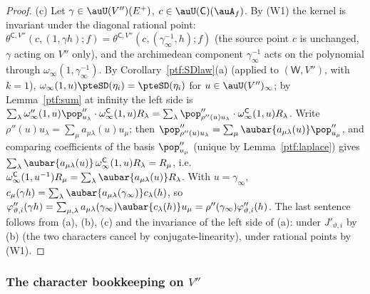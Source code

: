 \documentclass[10pt]{amsart}
\theoremstyle{definition}
\theoremstyle{remark}
\begin{document}
\begin{proof}
(c) Let $\gamma\in\auU(V'')(E^+)$, $c\in\auU(\mathsf C)(\auA_f)$. By (W1) the kernel is invariant under the diagonal
rational point: $\theta^{\mathsf C,V''}(c,(1,\gamma h);f)=\theta^{\mathsf C,V''}(c,(\gamma_\infty^{-1},h);f)$ (the source point $c$ is
unchanged, $\gamma$ acting on $V''$ only), and the archimedean component $\gamma_\infty^{-1}$ acts on the polynomial
through $\omega_\infty(1,\gamma_\infty^{-1})$. By Corollary~\ref{ptf:SDlaw}(a) (applied to $(\mathsf W,V'')$, with $k=1$),
$\omega_\infty(1,u)\pteSD(\eta_i)=\pteSD(\eta_i)$ for $u\in\auU(V'')_\infty$; by Lemma~\ref{ptf:sum} at infinity the left
side is $\sum_\lambda\omega''_\infty(1,u)\pop''_{u_\lambda}\cdot\omega^{\mathsf C}_\infty(1,u)R_\lambda=\sum_\lambda\pop''_{\rho''(u)u_\lambda}\cdot
\omega^{\mathsf C}_\infty(1,u)R_\lambda$. Write $\rho''(u)u_\lambda=\sum_\mu a_{\mu\lambda}(u)u_\mu$; then $\pop''_{\rho''(u)u_\lambda}=
\sum_\mu\aubar{a_{\mu\lambda}(u)}\pop''_{u_\mu}$, and comparing coefficients of the basis $\pop''_{u_\mu}$ (unique by
Lemma~\ref{ptf:laplace}) gives $\sum_\lambda\aubar{a_{\mu\lambda}(u)}\,\omega^{\mathsf C}_\infty(1,u)R_\lambda=R_\mu$, i.e.\
$\omega^{\mathsf C}_\infty(1,u^{-1})R_\mu=\sum_\lambda\aubar{a_{\mu\lambda}(u)}R_\lambda$. With $u=\gamma_\infty$, $c_\mu(\gamma h)=\sum_\lambda\aubar{a_{\mu\lambda}
(\gamma_\infty)}c_\lambda(h)$, so $\varphi''_{\vartheta,i}(\gamma h)=\sum_{\mu,\lambda}a_{\mu\lambda}(\gamma_\infty)\aubar{c_\lambda(h)}u_\mu=\rho''(\gamma_\infty)
\varphi''_{\vartheta,i}(h)$. The last sentence follows from (a), (b), (c) and the invariance of the left side of (a):
under $J'_{\vartheta,i}$ by (b) (the two characters cancel by conjugate-linearity), under rational points by (W1).
\end{proof}

\subsubsection{The character bookkeeping on $V''$}\label{ptf:ss-left}
\end{document}
